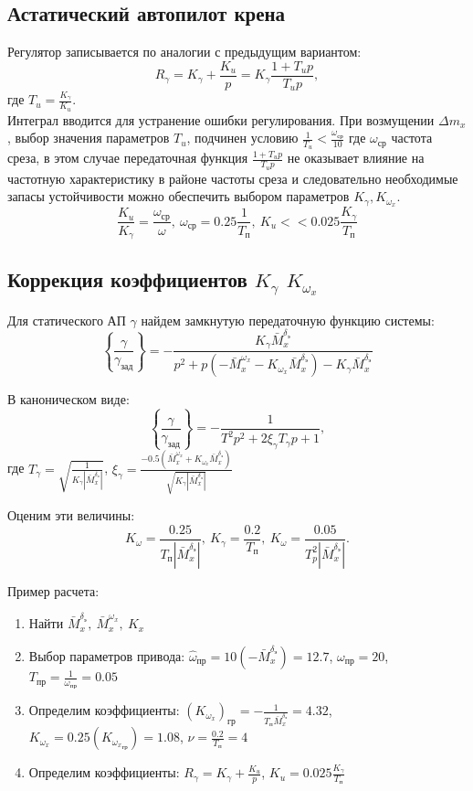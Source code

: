 \documentclass{article}
\begin{document}
\subsection{Астатический автопилот крена}
Регулятор записывается по аналогии с предыдущим вариантом:
\[
	R_\gamma = K_\gamma +\frac{K_u}{p}  = K_\gamma\frac{1 + T_u p}{T_u p},
\]
где $T_u  = \frac{K_\gamma}{K_u}$.\\
Интеграл вводится для устранение ошибки регулирования. При возмущении $\Delta
	m_x$, выбор значения параметров $T_u$, подчинен условию $\frac{1}{T_u} <
	\frac{\omega_\text{ср}}{10}$ где $\omega_\text{ср}$ частота среза, в этом
случае передаточная функция $\frac{1 + T_u p}{T_u p}$ не оказывает влияние на
частотную характеристику в районе частоты среза и следовательно необходимые
запасы устойчивости можно обеспечить выбором параметров $K_\gamma,
	K_{\omega_x}$.
\[
	\frac{K_u}{K_\gamma} =\frac{\omega_\text{ср}}{\omega}, \ \omega_\text{ср} =
	0.25\frac{1}{T_\text{п}}, \ K_u << 0.025\frac{K_\gamma}{T_\text{п}}
\]
\subsection{Коррекция коэффициентов \texorpdfstring{$K_\gamma$}{Lg}
	\texorpdfstring{$K_{\omega_x}$}{Lg}}
Для статического АП $\gamma$ найдем замкнутую передаточную функцию системы:
\[
	\left\{\frac{\gamma}{\gamma_\text{зад}}\right\} = -\frac{K_\gamma
	\bar{M}_x^{\delta_\text{э}}}{p^2 + p(-\bar{M}_x^{\omega_x} - K_{\omega_x}
	\bar{M}_x^{\delta_\text{э}}) - K_{\gamma} \bar{M}_x^{\delta_\text{э}}}
\]

В каноническом виде:
\[
	\left\{\frac{\gamma}{\gamma_\text{зад}}\right\} = -\frac{1}{T^2 p^2 +
		2\xi_{\gamma} T_{\gamma} p + 1},
\]
где $T_\gamma = \sqrt{\frac{1}{K_\gamma |\bar{M}_x^{\delta_\text{э}}|}}$,
$\xi_{\gamma} = \frac{-0.5(\bar{M}_x^{\omega_x} + K_{\omega_x}
	\bar{M}_x^{\delta_\text{э}})}{\sqrt{K_\gamma |\bar{M}_x^{\delta_\text{э}}|}}$

Оценим эти величины:
\[
	K_\omega =\frac{0.25}{T_\text{п}|\bar{M}_x^{\delta_\text{э}}|},\ K_\gamma =
	\frac{0.2}{T_\text{п}},\ K_\omega =\frac{0.05}{T_p^2
	|\bar{M}_x^{\delta_\text{э}}|}.
\]

Пример расчета:
\begin{enumerate}
	\item Найти $\bar{M}_x ^{\delta_\text{э}},\ \bar{M}_x^{\omega_x},\ K_x$
	\item Выбор параметров привода:
	      $\hat{\omega}_\text{пр} = 10(-\bar{M}_x^{\delta_\text{э}}) =  12.7$,
	      $\omega_\text{пр} = 20$, $T_\text{пр} = \frac{1}{\omega_\text{пр}} =
		      0.05$
	\item Определим коэффициенты:
	      $(K_{\omega_x})_\text{гр} = -\frac{1}{T_\text{п}
		      \bar{M}_x^{\delta_\text{э}}}=4.32$, $K_{\omega_x} = 0.25
		      (K_{{\omega_x}_\text{гр}}) = 1.08$, $\nu =\frac{0.2}{T_\text{п}}=4$
	\item Определим коэффициенты: $R_\gamma = K_\gamma +\frac{K_u}{p}$, $K_u =
		      0.025 \frac{K_\gamma}{T_\text{п}}$
\end{enumerate}
\end{document}
